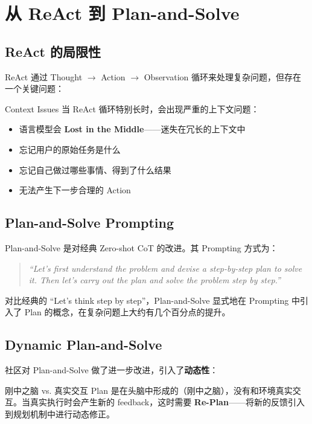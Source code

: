 \section{从 ReAct 到 Plan-and-Solve}

\subsection{ReAct 的局限性}

ReAct 通过 Thought $\rightarrow$ Action $\rightarrow$ Observation 循环来处理复杂问题，但存在一个关键问题：

\begin{warningbox}{Context Issues}
当 ReAct 循环特别长时，会出现严重的上下文问题：
\begin{itemize}
    \item 语言模型会 \textbf{Lost in the Middle}——迷失在冗长的上下文中
    \item 忘记用户的原始任务是什么
    \item 忘记自己做过哪些事情、得到了什么结果
    \item 无法产生下一步合理的 Action
\end{itemize}
\end{warningbox}

\subsection{Plan-and-Solve Prompting}

Plan-and-Solve 是对经典 Zero-shot CoT 的改进。其 Prompting 方式为：

\begin{quote}
\textit{``Let's first understand the problem and devise a step-by-step plan to solve it. Then let's carry out the plan and solve the problem step by step.''}
\end{quote}

对比经典的 ``Let's think step by step''，Plan-and-Solve 显式地在 Prompting 中引入了 Plan 的概念，在复杂问题上大约有几个百分点的提升。

\subsection{Dynamic Plan-and-Solve}

社区对 Plan-and-Solve 做了进一步改进，引入了\textbf{动态性}：

\begin{importantbox}{刚中之脑 vs. 真实交互}
Plan 是在头脑中形成的（刚中之脑），没有和环境真实交互。当真实执行时会产生新的 feedback，这时需要 \textbf{Re-Plan}——将新的反馈引入到规划机制中进行动态修正。
\end{importantbox}

